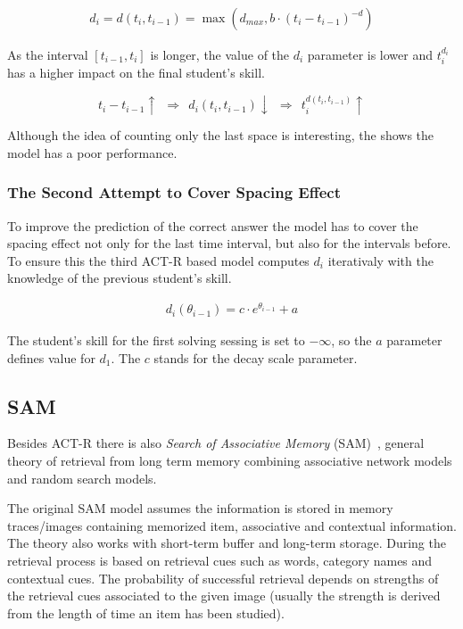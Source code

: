 \documentclass[a4paper]{article}
\begin{document}
\begin{align}
d_i = d(t_i, t_{i-1}) = \max\left(d_{max}, b \cdot (t_i - t_{i-1})^{-d}\right)
\end{align}

As the interval $[t_{i-1}, t_i]$ is longer, the value of the $d_i$ parameter is lower and $t_i^{d_i}$
has a higher impact on the final student's skill.

$$
t_i - t_{i-1} \uparrow~~\Longrightarrow~~d_i(t_i, t_{i-1})\downarrow~~\Longrightarrow~~t_i^{d(t_i, t_{i-1})} \uparrow
$$

Although the idea of counting only the last space is interesting, the \cite{Pavlik2005} shows the
model has a poor performance.

\subsubsection{The Second Attempt to Cover Spacing Effect}

To improve the prediction of the correct answer the model has to cover the spacing effect not only
for the last time interval, but also for the intervals before. To ensure this the third ACT-R based
model computes $d_i$ iterativaly with the knowledge of the previous student's skill.

\begin{align}
d_i(\theta_{i-1}) = c \cdot e^{\theta_{i-1}} + a
\end{align}

The student's skill for the first solving sessing is set to $-\infty$, so the $a$ parameter defines
value for $d_1$. The $c$ stands for the decay scale parameter.

\subsection{SAM}

Besides ACT-R there is also \textit{Search of Associative Memory} (SAM)~\cite{Raaijmakers2003, Raaijmakers1981}, general theory of retrieval
from long term memory combining associative network models and random search models.

The original SAM model assumes the information is stored in memory traces/images containing memorized item,
associative and contextual information. The theory also works with short-term buffer and long-term
storage. During the retrieval process is based on retrieval cues such as words, category names
and contextual cues. The probability of successful retrieval depends on strengths of the retrieval
cues associated to the given image (usually the strength is derived from the length of time an
item has been studied).
\end{document}
